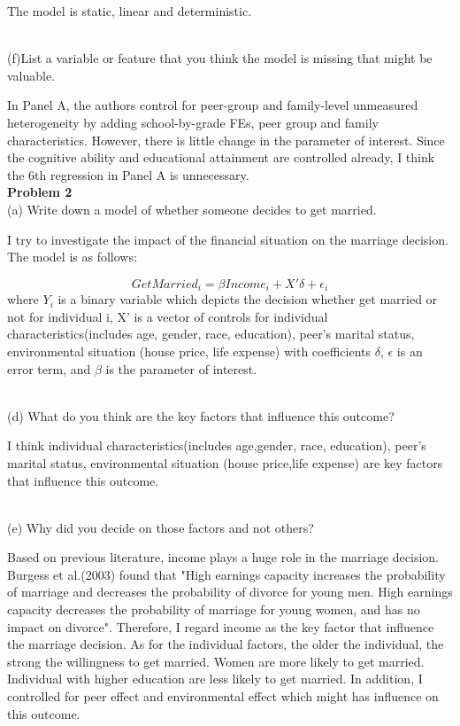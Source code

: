 \documentclass[letterpaper,12pt]{article}
\theoremstyle{definition}
\begin{document}
The model is static, linear and deterministic.

\textbf \\
{(f)}List a variable or feature that you think the model is missing that might be valuable.

In Panel A, the authors control for peer-group and family-level unmeasured heterogeneity by adding school-by-grade FEs, peer group and family characteristics. However, there is little change in the parameter of interest. Since the cognitive ability and educational attainment are controlled already, I think the 6th regression in Panel A is unnecessary.\\

\noindent\textbf{Problem 2}
\textbf \\
{(a)} Write down a model of whether someone decides to get married.

I try to investigate the impact of the financial situation on the marriage decision. The model is as follows:

\begin{equation}\label{EqCoolness}
GetMarried_{i} = \beta Income_{i} + X' \delta + \epsilon_{i}
\end{equation}
where $Y_{i}$ is a binary variable which depicts the decision whether get married or not for individual i, X' is a vector of controls for individual characteristics(includes age, gender, race, education), peer's marital status, environmental situation (house price, life expense) with coefficients $\delta$, $\epsilon$ is an error term, and $\beta$ is the parameter of interest.

\textbf \\
{(d)} What do you think are the key factors that influence this outcome?

I think individual characteristics(includes age,gender, race, education), peer’s marital status, environmental situation (house price,life expense) are key factors that influence this outcome.

\textbf \\
{(e)} Why did you decide on those factors and not others?

Based on previous literature, income plays a huge role in the marriage decision. Burgess et al.(2003) found that "High earnings capacity increases the probability of marriage and decreases the probability of divorce for young men. High earnings capacity decreases the probability of marriage for young women, and has no impact on divorce". Therefore, I regard income as the key factor that influence the marriage decision. As for the individual factors, the older the individual, the strong the willingness to get married. Women are more likely to get married. Individual with higher education are less likely to get married. In addition, I controlled for peer effect and environmental effect which might has influence on this outcome.
\end{document}
